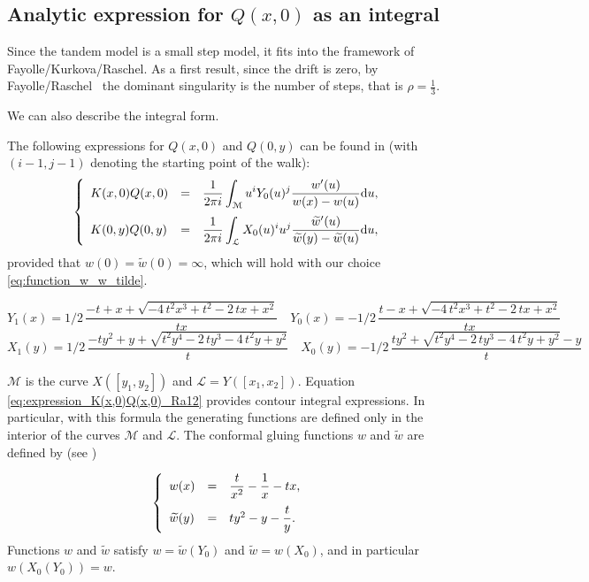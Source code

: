 \documentclass[11pt]{article}
\begin{document}
\subsection{Analytic expression for $Q(x,0)$ as an integral}
Since the tandem model is a small step model, it fits into the
framework of Fayolle/Kurkova/Raschel.  As a first result, since the
drift is zero, by Fayolle/Raschel~\cite{FaRa10} the dominant
singularity is the number of steps, that is $\rho=\frac{1}{3}$.

We can also describe the integral form. 


The following expressions for $Q(x,0)$ and $Q(0,y)$ can be found in \cite[Theorem 1]{Ra12} (with $(i-1,j-1)$ denoting the starting point of the walk):
\begin{equation}
\label{eq:expression_K(x,0)Q(x,0)_Ra12}
     \left\{\begin{array}{lll}
     K(x,0)Q(x,0) &=&\displaystyle \frac{1}{2\pi i}\int_{\mathcal M} u^iY_0(u)^j\frac{w'(u)}{w(x)-w(u)}\text{d}u,\medskip\\
     K(0,y)Q(0,y) &=&\displaystyle \frac{1}{2\pi i}\int_{\mathcal L} X_0(u)^{i}u^j\frac{\widetilde w'(u)}{\widetilde w(y)-\widetilde w(u)}\text{d}u,
     \end{array}\right.
\end{equation}
provided that $w(0)=\widetilde w(0)=\infty$, which will hold with our
choice \eqref{eq:function_w_w_tilde}.

\[Y_1(x)=1/2\,{\frac {-t+x+\sqrt {-4\,{t}^{2}{x}^{3}+{t}^{2}-2\,tx+{x}^{2}}}{t
x}}\quad Y_0(x)=-1/2\,{\frac {t-x+\sqrt {-4\,{t}^{2}{x}^{3}+{t}^{2}-2\,tx+{x}^{2}}
}{tx}}\]
\[X_1(y)=1/2\,{\frac {-t{y}^{2}+y+\sqrt {{t}^{2}{y}^{4}-2\,t{y}^{3}-4\,{t}^{2}
y+{y}^{2}}}{t}}\quad X_0(y)=
-1/2\,{\frac {t{y}^{2}+\sqrt {{t}^{2}{y}^{4}-2\,t{y}^{
3}-4\,{t}^{2}y+{y}^{2}}-y}{t}}\]



 $\mathcal M$ is the curve $X([y_1,y_2])$ and $\mathcal L=Y([x_1,x_2])$. Equation \eqref{eq:expression_K(x,0)Q(x,0)_Ra12} provides contour integral expressions. In particular, with this formula the generating functions are defined only in the interior of the curves $\mathcal M$ and $\mathcal L$.
The conformal gluing functions $w$ and $\widetilde w$ are defined by
(see \cite[Theorem 3 (iv)]{Ra12})

\begin{equation}
\label{eq:function_w_w_tilde}
     \left\{\begin{array}{lll}
     w(x) &=& \dfrac{t}{x^2}-\dfrac{1}{x}-tx,\medskip\\
     \widetilde w(y) &=& ty^2-y-\dfrac{t}{y}.
     \end{array}\right.
\end{equation}
Functions $w$ and $\widetilde w$ satisfy $w=\widetilde w(Y_0)$ and $\widetilde w=w(X_0)$, and in particular $w(X_0(Y_0))=w$.
\end{document}

